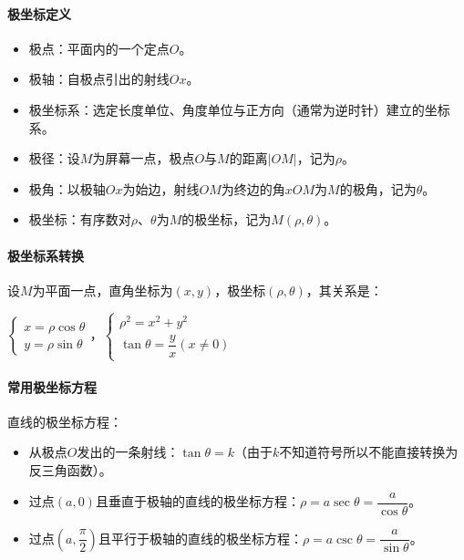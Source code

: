 \documentclass[UTF8, 12pt]{ctexart}
\begin{document}
\paragraph{极坐标定义} \leavevmode \medskip

\begin{itemize}
    \item 极点：平面内的一个定点$O$。
    \item 极轴：自极点引出的射线$Ox$。
    \item 极坐标系：选定长度单位、角度单位与正方向（通常为逆时针）建立的坐标系。
    \item 极径：设$M$为屏幕一点，极点$O$与$M$的距离$\vert OM\vert$，记为$\rho$。
    \item 极角：以极轴$Ox$为始边，射线$OM$为终边的角$xOM$为$M$的极角，记为$\theta$。
    \item 极坐标：有序数对$\rho$、$\theta$为$M$的极坐标，记为$M(\rho,\theta)$。
\end{itemize}

\paragraph{极坐标系转换} \leavevmode \medskip

设$M$为平面一点，直角坐标为$(x,y)$，极坐标$(\rho,\theta)$，其关系是：\medskip

$\left\{\begin{array}{l}
    x=\rho\cos\theta \\
    y=\rho\sin\theta
\end{array}\right.$，$\left\{\begin{array}{l}
    \rho^2=x^2+y^2 \\
    \tan\theta=\dfrac{y}{x}(x\neq0)
\end{array}\right.$\medskip

\paragraph{常用极坐标方程} \leavevmode \medskip

直线的极坐标方程：

\begin{itemize}
    \item 从极点$O$发出的一条射线：$\tan\theta=k$（由于$k$不知道符号所以不能直接转换为反三角函数）。
    \item 过点$(a,0)$且垂直于极轴的直线的极坐标方程：$\rho=a\sec\theta=\dfrac{a}{\cos\theta}$。
    \item 过点$\left(a,\dfrac{\pi}{2}\right)$且平行于极轴的直线的极坐标方程：$\rho=a\csc\theta=\dfrac{a}{\sin\theta}$。
\end{itemize}
\end{document}
